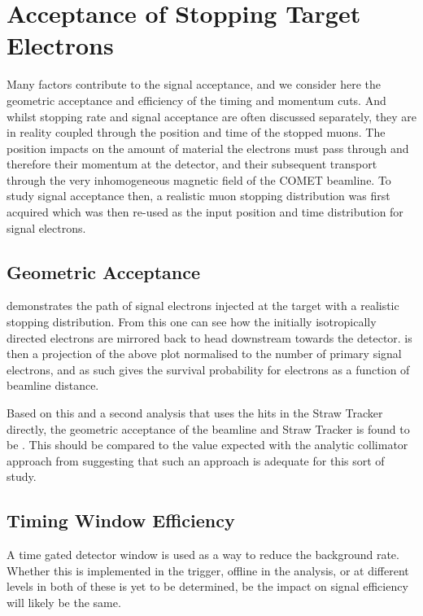 \section{Acceptance of Stopping Target Electrons}
\FigSensGeomAccept
Many factors contribute to the signal acceptance, and we consider here the geometric acceptance and efficiency of the timing and momentum cuts.
And whilst stopping rate and signal acceptance are often discussed separately, they are in reality coupled through the position and time of the stopped muons.
The position impacts on the amount of material the electrons must pass through and therefore their momentum at the detector, and their subsequent transport through the very inhomogeneous magnetic field of the COMET beamline.
To study signal acceptance then, a realistic muon stopping distribution was first acquired which was then re-used as the input position and time distribution for signal electrons.

\subsection{Geometric Acceptance}
 demonstrates the path of signal electrons injected at the target with a realistic stopping distribution.
From this one can see how the initially isotropically directed electrons are mirrored back to head downstream towards the detector.
 is then a projection of the above plot normalised to the number of primary signal electrons, and as such gives the survival probability for electrons as a function of beamline distance.

Based on this and a second analysis that uses the hits in the Straw Tracker directly, the geometric acceptance of the beamline and Straw Tracker is found to be \VarAcceptanceGeom.
This should be compared to the value expected with the analytic collimator approach from  suggesting that such an approach is adequate for this sort of study.

\subsection{Timing Window Efficiency}
A time gated detector window is used as a way to reduce the background rate. 
Whether this is implemented in the trigger, offline in the analysis, or at different levels in both of these is yet to be determined, be the impact on signal efficiency will likely be the same.
\FigSensTiming

